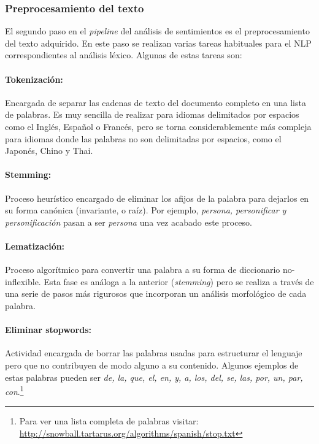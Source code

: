 \subsubsection{Preprocesamiento del texto}
\label{sec:textpreprocesing}

El segundo paso en el \emph{pipeline} del análisis de sentimientos es el
preprocesamiento del texto adquirido. En este paso se realizan varias tareas
habituales para el \ac{NLP} correspondientes al análisis léxico. Algunas de
estas tareas son:

\label{par:token}
\paragraph{Tokenización:}Encargada de separar las cadenas de texto del documento
completo en una lista de palabras. Es muy sencilla de realizar para idiomas
delimitados por espacios como el Inglés, Español o Francés, pero se torna
considerablemente más compleja para idiomas donde las palabras no son
delimitadas por espacios, como el Japonés, Chino y Thai.

\paragraph{Stemming:}Proceso heurístico encargado de eliminar los afijos de la
palabra para dejarlos en su forma canónica (invariante, o raíz). Por ejemplo,
\emph{persona,  personificar y personificación} pasan a ser \emph{persona}
una vez acabado este proceso.

\paragraph{Lematización:}Proceso algorítmico para convertir una
palabra a su forma de diccionario no-inflexible. Esta fase es análoga a la
anterior (\emph{stemming}) pero se realiza a través de una serie de pasos más
rigurosos que incorporan un análisis morfológico de cada palabra.

\paragraph{Eliminar stopwords:} Actividad encargada de borrar las palabras
usadas para estructurar el lenguaje pero que no contribuyen de modo alguno a su
contenido. Algunos ejemplos de estas palabras pueden ser \emph{de, la, que, el,
  en, y, a, los, del, se, las, por, un, par, con}.\footnote{Para ver una lista
  completa de palabras visitar:
  \url{http://snowball.tartarus.org/algorithms/spanish/stop.txt}}

